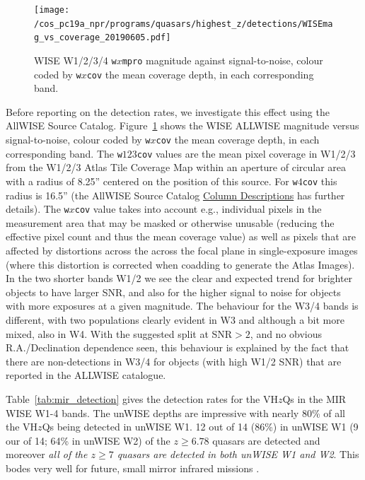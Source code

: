 \documentclass[usenatbib]{mnras}
\begin{document}
\begin{figure}
  \texttt{[image: /cos\_pc19a\_npr/programs/quasars/highest\_z/detections/WISEmag\_vs\_coverage\_20190605.pdf]}
  \centering
  \vspace{-14pt}
  \caption[]{WISE W1/2/3/4 {\tt w$x$mpro} magnitude against signal-to-noise,
    colour coded by {\tt w$x$cov} the mean coverage depth, in each corresponding band.}
  \label{fig:WISEmag_vs_coverage}
\end{figure}
Before reporting on the detection rates, we investigate this effect
using the AllWISE Source Catalog. Figure~\ref{fig:WISEmag_vs_coverage}
shows the WISE ALLWISE magnitude versus signal-to-noise, colour coded
by {\tt w$x$cov} the mean coverage depth, in each corresponding
band. The {\tt w$123$cov} values are the mean pixel coverage in W1/2/3
from the W1/2/3 Atlas Tile Coverage Map within an aperture of circular
area with a radius of 8.25'' centered on the position of this
source. For {\tt w$4$cov} this radius is 16.5'' (the AllWISE Source
Catalog
\href{http://wise2.ipac.caltech.edu/docs/release/allwise/expsup/sec2_1a.html#w2cov}{Column
Descriptions} has further details). The {\tt w$x$cov} value takes into
account e.g., individual pixels in the measurement area that may be
masked or otherwise unusable (reducing the effective pixel count and
thus the mean coverage value) as well as pixels that are affected by
distortions across the across the focal plane in single-exposure
images (where this distortion is corrected when coadding to generate
the Atlas Images). 
In the two shorter bands W1/2 we see the clear and expected
trend for brighter objects to have larger SNR, and also for the higher
signal to noise for objects with more exposures at a given
magnitude. The behaviour for the W3/4 bands is different, with two
populations clearly evident in W3 and although a bit more mixed, also
in W4. With the suggested split at SNR$>2$, and no obvious
R.A./Declination dependence seen, this behaviour is explained by the
fact that there are non-detections in W3/4 for objects (with high W1/2
SNR) that are reported in the ALLWISE catalogue.

Table~\ref{tab:mir_detection} gives the detection rates for the
VH$z$Qs in the MIR WISE W1-4 bands. The unWISE depths are impressive
with nearly 80\% of all the VH$z$Qs being detected in unWISE W1. 12
out of 14 (86\%) in unWISE W1 (9 our of 14; 64\% in unWISE W2) of the
$z\geq6.78$ quasars are detected and moreover {\it all of the $z\geq7$
quasars are detected in both unWISE W1 and W2}. This bodes very well
for future, small mirror infrared missions \citep[e.g.][]{NEOCam_WP}.
\end{document}
